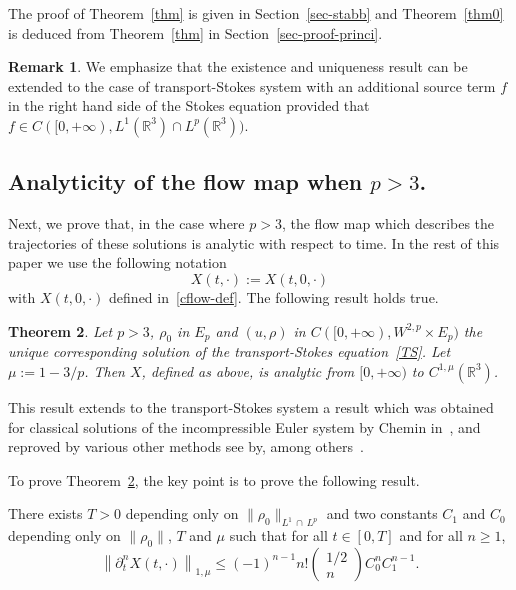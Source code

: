 \documentclass[10pt]{amsart}
\newtheorem{theo}{Theorem}[section]
\theoremstyle{definition}\newtheorem{defi}[theo]{Definition}\newtheorem{rema}[theo]{Remark}\newtheorem{exam}[theo]{Example}\newtheorem{exem}[theo]{Example}\newtheorem{nota}[theo]{Notation}
\newcommand{\R}{\mathbb{R}}
\renewcommand{\leq}{\leqslant}
\renewcommand{\geq}{\geqslant}
\begin{document}
The proof of Theorem~\ref{thm} is given in Section~\ref{sec-stabb} and Theorem~\ref{thm0} is deduced from Theorem~\ref{thm} in Section~\ref{sec-proof-princi}.

\begin{rema}\label{rem:TS_avec_terme_source}
We emphasize that the existence and uniqueness result can be extended to the case of transport-Stokes system with an additional source term $f$ in the right hand side of the Stokes equation provided that $f \in C([0,+\infty), L^1(\R^3) \cap L^p(\R^3))$.
\end{rema}


\subsection{Analyticity of the flow map when \texorpdfstring{$p > 3$}{p>3}.}

Next, we prove that, in the case where $p>3$, the flow map which describes the trajectories of these solutions is analytic with respect to time. In the rest of this paper we use the following notation
\[
X(t,\cdot):=X(t,0,\cdot)
\]
with $X(t,0,\cdot)$ defined in~\eqref{cflow-def}. The following result holds true.
\begin{theo}\label{analytic}
Let $p>3$, $\rho_0$ in $E_p$ and $ (u,\rho)$ in $C([0,+\infty),W^{2,p} \times E_p)$ the unique corresponding solution of the transport-Stokes equation~\eqref{TS}. Let $\mu:=1-3/p$. Then $ X$, defined as above, is analytic from $[0,+\infty)$ to $ C^{1,\mu}(\R^3)$.
\end{theo} This result extends to the transport-Stokes system a result which was obtained for classical solutions of the incompressible Euler system by Chemin in~\cite{Chemin}, and reproved by various other methods see by, among others~\cite{CVW,FZ,Gamblin,ogfstt,Inci,Kato,
Serfati,Shnirelman}.


To prove Theorem~\ref{analytic}, the key point is to prove the following result.

\begin{prop}\label{apana}
There exists $T>0$ depending only on $\|\rho_0\|_{L^1\, \cap\, L^p}$ and two constants $C_1 $ and $C_0$ depending only on $\|\rho_0\|$, $T$ and $\mu$ such that for all $t\in[0,T]$ and for all $n\geq1$,
\begin{equation}\label{rec_formule}
\left\|\partial_t^{n} X(t,\cdot)\right\|_{1,\mu} \leq (-1)^{n-1} n!
\begin{pmatrix}
1/2 \\ n
\end{pmatrix}
C_0^n C_1^{n-1}.
\end{equation}
\end{prop}
\end{document}

